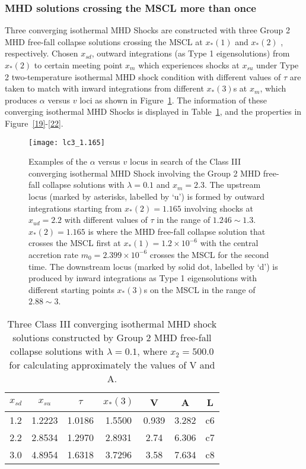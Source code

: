 \documentclass[fleqn,usenatbib]{mnras}
\begin{document}

\subsubsection{MHD solutions crossing the MSCL more than once}
\label{s5.3.2}
Three converging isothermal MHD Shocks are constructed with three Group 2 MHD free-fall collapse solutions crossing the MSCL at $x_{*}(1)$ and $x_{*}(2)$ \citep{yuLou2005}, respectively. Chosen $x_{sd}$, outward integrations (as Type 1 eigensolutions) from $x_{*}(2)$ to certain meeting point $x_{m}$ which experiences shocks at $x_{su}$ under Type 2 two-temperature isothermal MHD shock condition with different values of $\tau$ are taken to match with inward integrations from different $x_{*}(3)$s at $x_{m}$, which produces $\alpha$ versus $v$ loci as shown in Figure~\ref{18}. The information of these converging isothermal MHD Shocks is displayed in Table~\ref{t5}, and the properties in Figure~\ref{19}-\ref{22}.

\begin{figure}
\centering
\texttt{[image: lc3\_1.165]}
\caption{Examples of the $\alpha$ versus $v$ locus in search of the Class III converging isothermal MHD Shock involving the Group 2 MHD free-fall collapse solutions with $\lambda=0.1$ and $x_{m}=2.3$. The upstream locus (marked by asterisks, labelled by `u') is formed by outward integrations starting from $x_{*}(2)=1.165$ involving shocks at $x_{ud}=2.2$ with different values of $\tau$ in the range of $1.246\sim 1.3$. $x_{*}(2)=1.165$ is where the MHD free-fall collapse solution that crosses the MSCL first at $x_{*}(1)=1.2\times 10^{-6}$ with the central accretion rate $m_{0}=2.399\times 10^{-6}$ crosses the MSCL for the second time. The downstream locus (marked by solid dot, labelled by `d') is produced by inward integrations as Type 1 eigensolutions with different starting points $x_{*}(3)$s on the MSCL in the range of $2.88\sim 3$.}
\label{18}
\end{figure}

\begin{table}
\centering
\caption{Three Class III converging isothermal MHD shock solutions constructed by Group 2 MHD free-fall collapse solutions with $\lambda=0.1$, where $x_{2}=500.0$ for calculating approximately the values of V and A.}
\begin{tabular}{ccccccc}
\hline
$x_{sd}$ & $x_{su}$ & $\tau$ & $x_{*}(3)$ & V & A & L\\
\hline
1.2 & 1.2223 & 1.0186 & 1.5500 & 0.939 & 3.282 & c6\\
2.2 & 2.8534 & 1.2970 & 2.8931 & 2.74 & 6.306 & c7\\
3.0 & 4.8954 & 1.6318 & 3.7296 & 3.58 & 7.634  & c8\\
\hline
\end{tabular}
\label{t5}
\end{table}
\end{document}
